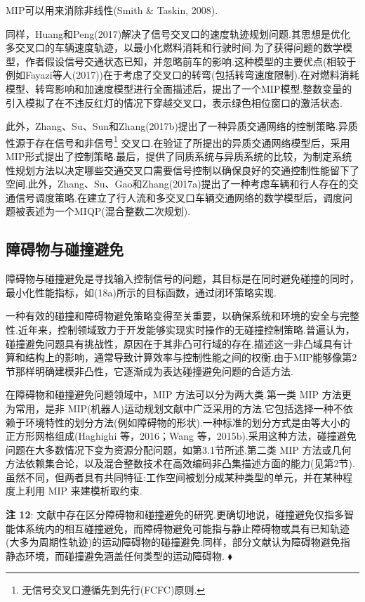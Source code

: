 \documentclass[10pt]{article}
\begin{document}
MIP可以用来消除非线性(Smith \& Taskin, 2008).

同样，Huang和Peng(2017)解决了信号交叉口的速度轨迹规划问题.其思想是优化多交叉口的车辆速度轨迹，以最小化燃料消耗和行驶时间.为了获得问题的数学模型，作者假设信号交通状态已知，并忽略前车的影响.这种模型的主要优点(相较于例如Fayazi等人(2017))在于考虑了交叉口的转弯(包括转弯速度限制).在对燃料消耗模型、转弯影响和加速度模型进行全面描述后，提出了一个MIP模型.整数变量的引入模拟了在不违反红灯的情况下穿越交叉口，表示绿色相位窗口的激活状态.

此外，Zhang、Su、Sun和Zhang(2017b)提出了一种异质交通网络的控制策略.异质性源于存在信号和非信号\footnote{无信号交叉口遵循先到先行(FCFC)原则.} 交叉口.在验证了所提出的异质交通网络模型后，采用MIP形式提出了控制策略.最后，提供了同质系统与异质系统的比较，为制定系统性规划方法以决定哪些交通交叉口需要信号控制以确保良好的交通控制性能留下了空间.此外，Zhang、Su、Gao和Zhang(2017a)提出了一种考虑车辆和行人存在的交通信号调度策略.在建立了行人流和多交叉口车辆交通网络的数学模型后，调度问题被表述为一个MIQP(混合整数二次规划).

\subsection{障碍物与碰撞避免}

障碍物与碰撞避免是寻找输入控制信号的问题，其目标是在同时避免碰撞的同时，最小化性能指标，如(18a)所示的目标函数，通过闭环策略实现.

一种有效的碰撞和障碍物避免策略变得至关重要，以确保系统和环境的安全与完整性.近年来，控制领域致力于开发能够实现实时操作的无碰撞控制策略.普遍认为，碰撞避免问题具有挑战性，原因在于其非凸可行域的存在.描述这一非凸域具有计算和结构上的影响，通常导致计算效率与控制性能之间的权衡.由于MIP能够像第2节那样明确建模非凸性，它逐渐成为表达碰撞避免问题的合适方法.

在障碍物和碰撞避免问题领域中，MIP 方法可以分为两大类.第一类 MIP 方法更为常用，是非 MIP(机器人)运动规划文献中广泛采用的方法.它包括选择一种不依赖于环境特性的划分方法(例如障碍物的形状).一种标准的划分方式是由等大小的正方形网格组成(Haghighi 等，2016；Wang 等，2015b).采用这种方法，碰撞避免问题在大多数情况下变为资源分配问题，如第3.1节所述.第二类 MIP 方法或几何方法依赖集合论，以及混合整数技术在高效编码非凸集描述方面的能力(见第2节).虽然不同，但两者具有共同特征:工作空间被划分成某种类型的单元，并在某种程度上利用 MIP 来建模析取约束.

\vspace{1 em}
\noindent\textbf{注 12}: 文献中存在区分障碍物和碰撞避免的研究.更确切地说，碰撞避免仅指多智能体系统内的相互碰撞避免，而障碍物避免可能指与静止障碍物或具有已知轨迹(大多为周期性轨迹)的运动障碍物的碰撞避免.同样，部分文献认为障碍物避免指静态环境，而碰撞避免涵盖任何类型的运动障碍物. \(\blacklozenge\)
\vspace{1 em}
\end{document}
